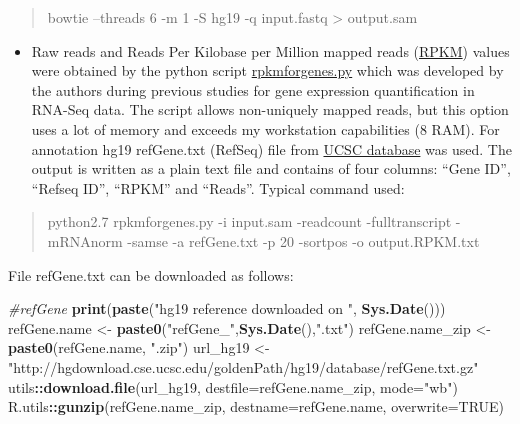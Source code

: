 \documentclass[]{article}
\newenvironment{Shaded}{\begin{snugshade}}{\end{snugshade}}
\newcommand{\KeywordTok}[1]{\textcolor[rgb]{0.13,0.29,0.53}{\textbf{#1}}}
\newcommand{\DataTypeTok}[1]{\textcolor[rgb]{0.13,0.29,0.53}{#1}}
\newcommand{\StringTok}[1]{\textcolor[rgb]{0.31,0.60,0.02}{#1}}
\newcommand{\CommentTok}[1]{\textcolor[rgb]{0.56,0.35,0.01}{\textit{#1}}}
\newcommand{\OtherTok}[1]{\textcolor[rgb]{0.56,0.35,0.01}{#1}}
\newcommand{\OperatorTok}[1]{\textcolor[rgb]{0.81,0.36,0.00}{\textbf{#1}}}
\newcommand{\NormalTok}[1]{#1}
\providecommand{\tightlist}{%
  \setlength{\itemsep}{0pt}\setlength{\parskip}{0pt}}
\begin{document}
\begin{quote}
bowtie --threads 6 -m 1 -S hg19 -q input.fastq \textgreater{} output.sam
\end{quote}

\begin{itemize}
\tightlist
\item
  Raw reads and Reads Per Kilobase per Million mapped reads
  (\href{https://wiki.nci.nih.gov/pages/viewpage.action?pageId=71439191}{RPKM})
  values were obtained by the python script
  \href{http://sandberg.cmb.ki.se/media/data/rnaseq/instructions-rpkmforgenes.html}{rpkmforgenes.py}
  which was developed by the authors during previous studies for gene
  expression quantification in RNA-Seq data. The script allows
  non-uniquely mapped reads, but this option uses a lot of memory and
  exceeds my workstation capabilities (8 RAM). For annotation hg19
  refGene.txt (RefSeq) file from
  \href{http://hgdownload.cse.ucsc.edu/goldenpath/hg19/database/}{UCSC
  database} was used. The output is written as a plain text file and
  contains of four columns: ``Gene ID'', ``Refseq ID'', ``RPKM'' and
  ``Reads''. Typical command used:
\end{itemize}

\begin{quote}
python2.7 rpkmforgenes.py -i input.sam -readcount -fulltranscript
-mRNAnorm -samse -a refGene.txt -p 20 -sortpos -o output.RPKM.txt
\end{quote}

File refGene.txt can be downloaded as follows:

\begin{Shaded}
\begin{Highlighting}[]
\CommentTok{#refGene}
\KeywordTok{print}\NormalTok{(}\KeywordTok{paste}\NormalTok{(}\StringTok{"hg19 reference downloaded on "}\NormalTok{, }\KeywordTok{Sys.Date}\NormalTok{()))}
\NormalTok{refGene.name <-}\StringTok{ }\KeywordTok{paste0}\NormalTok{(}\StringTok{"refGene_"}\NormalTok{,}\KeywordTok{Sys.Date}\NormalTok{(),}\StringTok{".txt"}\NormalTok{)}
\NormalTok{refGene.name_zip <-}\StringTok{ }\KeywordTok{paste0}\NormalTok{(refGene.name, }\StringTok{".zip"}\NormalTok{)}
\NormalTok{url_hg19 <-}\StringTok{ "http://hgdownload.cse.ucsc.edu/goldenPath/hg19/database/refGene.txt.gz"}
\NormalTok{utils}\OperatorTok{::}\KeywordTok{download.file}\NormalTok{(url_hg19, }\DataTypeTok{destfile=}\NormalTok{refGene.name_zip, }\DataTypeTok{mode=}\StringTok{"wb"}\NormalTok{)}
\NormalTok{R.utils}\OperatorTok{::}\KeywordTok{gunzip}\NormalTok{(refGene.name_zip, }\DataTypeTok{destname=}\NormalTok{refGene.name, }\DataTypeTok{overwrite=}\OtherTok{TRUE}\NormalTok{)}
\end{Highlighting}
\end{Shaded}
\end{document}
